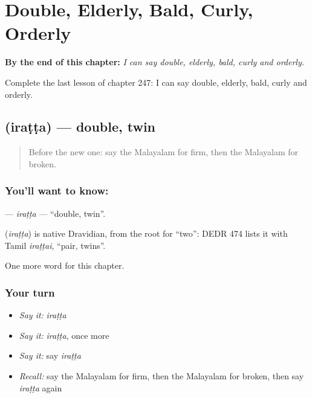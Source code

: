 
\chapter{Double, Elderly, Bald, Curly, Orderly}
\label{ch:ml-double-elderly-bald-curly-orderly}

\begin{chapteropening}
\textbf{By the end of this chapter:} \emph{I can say double, elderly, bald, curly and orderly.}

Complete the last lesson of chapter 247: I can say double, elderly, bald, curly and orderly.
\end{chapteropening}

\section[\texorpdfstring{\ml{ഇരട്ട} (iraṭṭa)}{ഇരട്ട (iraṭṭa)}]{ (iraṭṭa) — double, twin}

\label{lesson:ML-C247-iratta}



\begin{quote}
Before the new one: say the Malayalam for firm, then the Malayalam for broken.
\end{quote}

\subsection*{You'll want to know: }
\textbf{} — \emph{iraṭṭa} — \textquotedblleft{}double, twin\textquotedblright{}.

\begin{cousinweb}
\textbf{} (\emph{iraṭṭa}) is native Dravidian, from the root for \textquotedblleft{}two\textquotedblright{}: DEDR 474 lists it with Tamil \emph{iraṭṭai}, \textquotedblleft{}pair, twins\textquotedblright{}.
\end{cousinweb}

\begin{grammarlens}[title={What you've built}]
One more word for this chapter.
\end{grammarlens}

\subsection*{Your turn}
\begin{itemize}
\raggedright
  \item \emph{Say it:} \emph{iraṭṭa}
  \item \emph{Say it:} \emph{iraṭṭa}, once more
  \item \emph{Say it:} say \emph{iraṭṭa}
  \item \emph{Recall:} say the Malayalam for firm, then the Malayalam for broken, then say \emph{iraṭṭa} again
\end{itemize}

